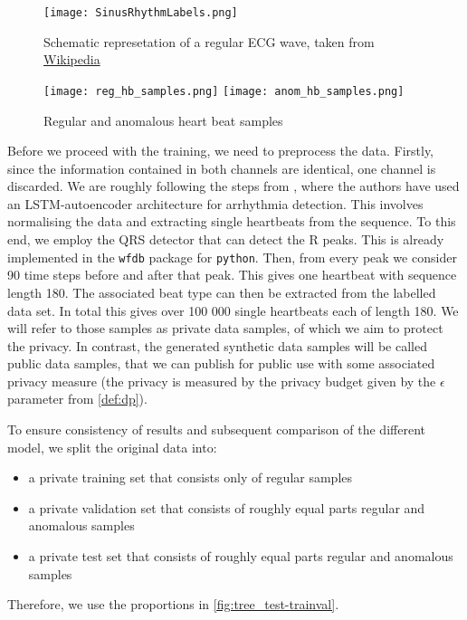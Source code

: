 \begin{figure}[h]
    \centering
    \texttt{[image: SinusRhythmLabels.png]}
    \caption{Schematic represetation of a regular ECG wave, taken from \href{https://en.wikipedia.org/wiki/QRS_complex}{Wikipedia}}
\end{figure}


\begin{figure}[h]
    \centering
    \texttt{[image: reg\_hb\_samples.png]}
    \texttt{[image: anom\_hb\_samples.png]}
    \caption{Regular and anomalous heart beat samples}
\end{figure}

Before we proceed with the training, we need to preprocess the data. Firstly, since the information contained in both channels are identical, one channel is discarded. We are roughly following the steps from \parencite{ROY2023106484}, where the authors have used an LSTM-autoencoder architecture for arrhythmia detection. This involves normalising the data and extracting single heartbeats from the sequence. To this end, we employ the QRS detector that can detect the R peaks. This is already implemented in the \texttt{wfdb} \parencite{wfdb} package for \texttt{python}. Then, from every peak we consider 90 time steps before and after that peak. This gives one heartbeat with sequence length 180. The associated beat type can then be extracted from the labelled data set. In total this gives over 100 000 single heartbeats each of length 180. We will refer to those samples as private data samples, of which we aim to protect the privacy. In contrast, the generated synthetic data samples will be called public data samples, that we can publish for public use with some associated privacy measure (the privacy is measured by the privacy budget given by the \(\epsilon\) parameter from \cref{def:dp}).

To ensure consistency of results and subsequent comparison of the different model, we split the original data into:
\begin{itemize}
    \item a private training set that consists only of regular samples
    \item a private validation set that consists of roughly equal parts regular and anomalous samples
    \item a private test set that consists of roughly equal parts regular and anomalous samples
\end{itemize}

Therefore, we use the proportions in \cref{fig:tree_test-trainval}.

